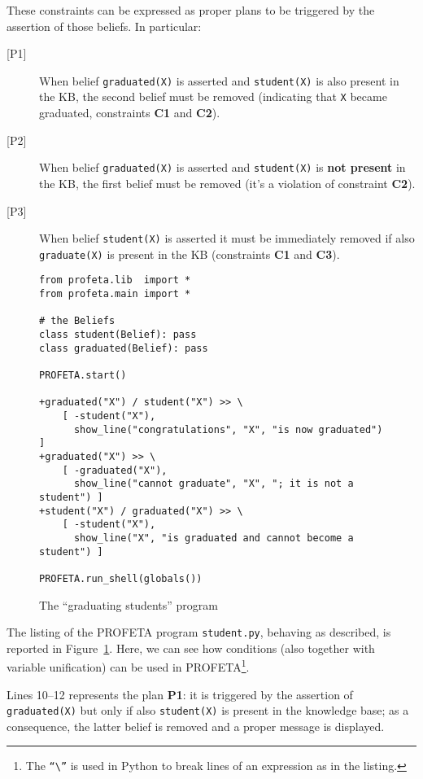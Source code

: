 These constraints can be expressed as proper plans to be triggered by the
assertion of those beliefs.
In particular:
\begin{description}
\item[{[P1]}] When belief \texttt{graduated(X)} is asserted and \texttt{student(X)}
  is also present in the KB, the second belief must be removed (indicating
  that \texttt{X} became graduated, constraints \textbf{C1} and
  \textbf{C2}).
\item[{[P2]}] When belief \texttt{graduated(X)} is asserted and \texttt{student(X)}
  is \textbf{not present} in the KB, the first belief must be removed (it's
  a violation of constraint \textbf{C2}).
\item[{[P3]}] When belief \texttt{student(X)} is asserted it must be
immediately removed if also \texttt{graduate(X)} is present in the KB
(constraints \textbf{C1} and \textbf{C3}).
\end{description}

\begin{figure}[b!]
\python%
\begin{lstlisting}
from profeta.lib  import *
from profeta.main import *

# the Beliefs
class student(Belief): pass
class graduated(Belief): pass

PROFETA.start()

+graduated("X") / student("X") >> \
    [ -student("X"),
      show_line("congratulations", "X", "is now graduated") ]
+graduated("X") >> \
    [ -graduated("X"),
      show_line("cannot graduate", "X", "; it is not a student") ]
+student("X") / graduated("X") >> \
    [ -student("X"),
      show_line("X", "is graduated and cannot become a student") ]

PROFETA.run_shell(globals())
\end{lstlisting}
\caption{The ``graduating students'' program}\label{fig:student}
\end{figure}

The listing of the PROFETA program \texttt{student.py}, behaving as
described, is reported in Figure~\ref{fig:student}.
Here, we can see how conditions (also together with variable unification)
can be used in PROFETA\footnote{The \texttt{``\textbackslash''} is used
in Python to break lines of an expression as in the listing.}.

Lines 10--12 represents the plan \textbf{P1}: it is triggered by the
assertion of \texttt{graduated(X)} but only if also \texttt{student(X)} is
present in the knowledge base; as a consequence, the latter belief is
removed and a proper message is displayed.

